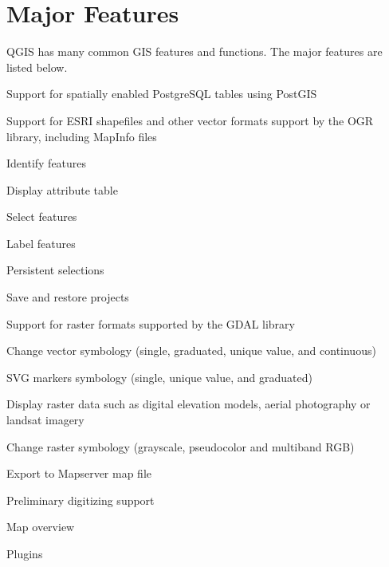 \section{Major Features}

QGIS has many common GIS features and functions. The major features
are listed below. 

\begin{compactenum}
\item Support for spatially enabled PostgreSQL tables using PostGIS 
\item Support for ESRI shapefiles and other vector formats support by the
OGR library, including MapInfo files 
\item Identify features 
\item Display attribute table 
\item Select features 
\item Label features
\item Persistent selections 
\item Save and restore projects
\item Support for raster formats supported by the GDAL library 
\item Change vector symbology (single, graduated, unique value, and continuous) 
\item SVG markers symbology (single, unique value, and graduated) 
\item Display raster data such as digital elevation models, aerial photography
or landsat imagery 
\item Change raster symbology (grayscale, pseudocolor and multiband RGB) 
\item Export to Mapserver map file 
\item Preliminary digitizing support
\item Map overview
\item Plugins 
\end{compactenum}
